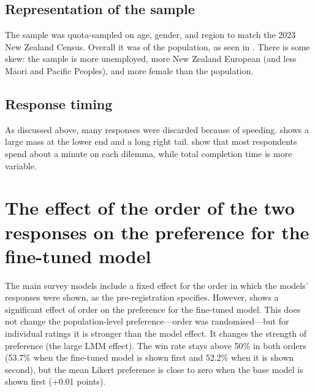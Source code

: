 \subsection{Representation of the sample}

The sample was quota-sampled on age, gender, and region to match the 2023 New Zealand Census. Overall it was  of the population, as seen in . There is some skew: the sample is more unemployed, more New Zealand European (and less Māori and Pacific Peoples), and more female than the population.


\subsection{Response timing}

As discussed above, many responses were discarded because of speeding.  shows a large mass at the lower end and a long right tail.  show that most respondents spend about a minute on each dilemma, while total completion time is more variable.




\section{The effect of the order of the two responses on the preference for the fine-tuned model}
\label{sec:order-effect}

The main survey models include a fixed effect for the order in which the models' responses were shown, as the pre-registration specifies. However,  shows a significant effect of order on the preference for the fine-tuned model. This does not change the population-level preference—order was randomised—but for individual ratings it is stronger than the model effect. It changes the strength of preference (the large LMM effect). The win rate stays above 50\% in both orders (53.7\% when the fine-tuned model is shown first and 52.2\% when it is shown second), but the mean Likert preference is close to zero when the base model is shown first (+0.01 points).

